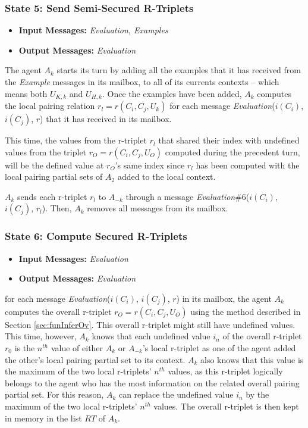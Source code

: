 \subsubsection{State 5: Send Semi-Secured R-Triplets}

\begin{itemize}
    \item \textbf{Input Messages:} \emph{Evaluation, Examples}
    \item \textbf{Output Messages:} \emph{Evaluation}
\end{itemize}

The agent $A_{k}$ starts its turn by adding all the examples that it has received from the \emph{Example} messages in its mailbox, to all of its currents contexts -- which means both $U_{K,k}$ and $U_{H,k}$. Once the examples have been added, $A_{k}$ computes the local pairing relation $r_{l} = r(C_{i}, C_{j}, U_{k})$ for each message \emph{Evaluation}($i(C_{i})$, $i(C_{j})$, $r$) that it has received in its mailbox.

This time, the values from the r-triplet $r_{l}$ that shared their index with undefined values from the triplet $r_{O} = r(C_{i}, C_{j}, U_{O})$ computed during the precedent turn, will be the defined value at $r_{O}$'s same index since $r_{l}$ has been computed with the local pairing partial sets of $A_{2}$ added to the local context.

$A_{k}$ sends each r-triplet $r_{l}$ to $A_{-k}$ through a message \emph{Evaluation}\#6($i(C_{i})$, $i(C_{j})$, $r_{l}$). Then, $A_{k}$ removes all messages from its mailbox. 

\subsubsection{State 6: Compute Secured R-Triplets}

\begin{itemize}
    \item \textbf{Input Messages:} \emph{Evaluation}
    \item \textbf{Output Messages:} \emph{Evaluation}
\end{itemize}

for each message \emph{Evaluation}($i(C_{i})$, $i(C_{j})$, $r$) in its mailbox, the agent $A_{k}$ computes the overall r-triplet $r_{O} =  r(C_{i}, C_{j}, U_{O})$ using the method described in Section \ref{sec:funInferOv}. This overall r-triplet might still have undefined values. This time, however, $A_{k}$ knows that each undefined value $i_{n}$ of the overall r-triplet $r_{0}$ is the $n^{th}$ value of either $A_{k}$ or $A_{-k}$'s local r-triplet as one of the agent added the other's local pairing partial set to its context. $A_{k}$ also knows that this value is the maximum of the two local r-triplets' $n^{th}$ values, as this r-triplet logically belongs to the agent who has the most information on the related overall pairing partial set. For this reason, $A_{k}$ can replace the undefined value $i_{n}$ by the maximum of the two local r-triplets' $n^{th}$ values. The overall r-triplet is then kept in memory in the list $RT$ of $A_{k}$.

